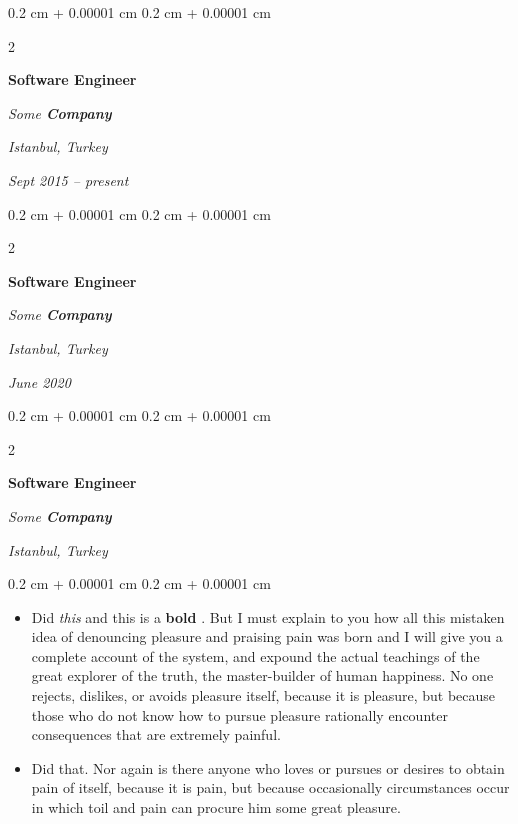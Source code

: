\documentclass[10pt, letterpaper]{article}
\newenvironment{highlights}{
    \begin{itemize}[
        topsep=0.10 cm,
        parsep=0.10 cm,
        partopsep=0pt,
        itemsep=0pt,
        leftmargin=0.4 cm + 10pt
    ]
}{
    \end{itemize}
} %
\newenvironment{onecolentry}{
    \begin{adjustwidth}{
        0.2 cm + 0.00001 cm
    }{
        0.2 cm + 0.00001 cm
    }
}{
    \end{adjustwidth}
} %
\newenvironment{twocolentry}[2][]{
    \onecolentry
    \def\secondColumn{#2}
    \setcolumnwidth{\fill, 4.5 cm}
    \begin{paracol}{2}
}{
    \switchcolumn \raggedleft \secondColumn
    \end{paracol}
    \endonecolentry
} %
\let\hrefWithoutArrow\href
\renewcommand{\href}[2]{\hrefWithoutArrow{#1}{\ifthenelse{\equal{#2}{}}{ }{#2 }\raisebox{.15ex}{\footnotesize \faExternalLink*}}}
\begin{document}
        \vspace{0.2 cm}

            \begin{twocolentry}{
        \textit{Istanbul, Turkey}

        \textit{Sept 2015 – present}    }
                \textbf{Software Engineer}

                \textit{Some \textbf{Company}}
            \end{twocolentry}



        \vspace{0.2 cm}

            \begin{twocolentry}{
        \textit{Istanbul, Turkey}

        \textit{June 2020}    }
                \textbf{Software Engineer}

                \textit{Some \textbf{Company}}
            \end{twocolentry}



        \vspace{0.2 cm}

            \begin{twocolentry}{
        \textit{Istanbul, Turkey}

            }
                \textbf{Software Engineer}

                \textit{Some \textbf{Company}}
            \end{twocolentry}

        \vspace{0.10 cm}
        \begin{onecolentry}
            \begin{highlights}
                \item Did \textit{this} and this is a \textbf{bold} \href{https://example.com}{link}. But I must explain to you how all this mistaken idea of denouncing pleasure and praising pain was born and I will give you a complete account of the system, and expound the actual teachings of the great explorer of the truth, the master-builder of human happiness. No one rejects, dislikes, or avoids pleasure itself, because it is pleasure, but because those who do not know how to pursue pleasure rationally encounter consequences that are extremely painful.
                \item Did that. Nor again is there anyone who loves or pursues or desires to obtain pain of itself, because it is pain, but because occasionally circumstances occur in which toil and pain can procure him some great pleasure.
            \end{highlights}
        \end{onecolentry}
\end{document}
